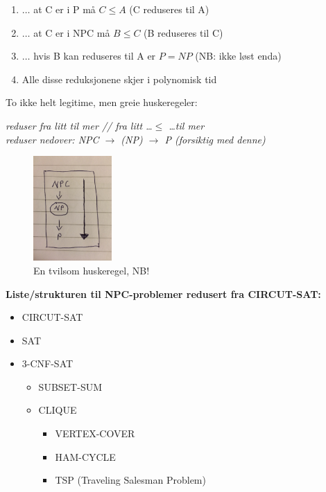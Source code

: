 \documentclass[a4paper, norsk,  10pt]{article}
\begin{document}
{{\begin{algorithmic}
\begin{enumerate}
	\item $\dots$ at C er i P må $C \leq A$ (C reduseres til A)
	\item $\dots$ at C er i NPC må $B \leq C$ (B reduseres til C)
	\item $\dots$ hvis B kan reduseres til A er $P = NP$ (NB: ikke løst enda)
	\item Alle disse reduksjonene skjer i polynomisk tid
\end{enumerate}

\noindent To ikke helt legitime, men greie huskeregeler: 
\begin{center}
\textit{reduser fra litt til mer // fra litt \dots $\leq$ \dots til mer\\ }
\textit{reduser nedover: NPC $\rightarrow$ (NP) $\rightarrow$ P (forsiktig med denne)\\ \hfill}
\end{center}

\begin{figure}[hbt]
    \begin{center}
        \includegraphics[width=3cm] {cheat.jpg}
        \caption{En tvilsom huskeregel, NB!}
    \end{center}
\end{figure}

\noindent \textbf{Liste/strukturen til NPC-problemer redusert fra CIRCUT-SAT:}

\begin{itemize}
\item CIRCUT-SAT
\item SAT
\item 3-CNF-SAT
	\begin{itemize}
		\item SUBSET-SUM
		\item CLIQUE
		\begin{itemize}
				\item VERTEX-COVER
				\item HAM-CYCLE
				\item TSP (Traveling Salesman Problem)
		\end{itemize}
	\end{itemize}
\end{itemize}


\end{algorithmic}}}
\end{document}
